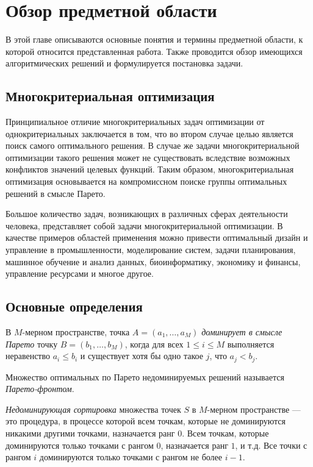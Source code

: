 \chapter{Обзор предметной области}
В этой главе описываются основные понятия и термины предметной области, к которой относится представленная работа. Также проводится обзор имеющихся алгоритмических решений и формулируется постановка задачи.

\section{Многокритериальная оптимизация}
Принципиальное отличие многокритериальных задач оптимизации от однокритериальных заключается в том, что во втором случае целью является поиск самого оптимального решения.
В случае же задачи многокритериальной оптимизации такого решения может не существовать вследствие возможных конфликтов значений целевых функций.
Таким образом, многокритериальная оптимизация основывается на компромиссном поиске группы оптимальных решений в смысле Парето.

Большое количество задач, возникающих в различных сферах деятельности человека, представляет собой задачи многокритериальной оптимизации.
В качестве примеров областей применения можно привести оптимальный дизайн и управление в промышленности, моделирование систем, задачи планирования, машинное обучение и анализ данных, биоинформатику, экономику и финансы, управление ресурсами и многое другое.

\section{Основные определения}
\begin{definition}
    В $M$-мерном пространстве, точка $A = (a_1, \ldots, a_M)$ \textit{доминирует в смысле Парето} точку $B = (b_1, \ldots, b_M)$, когда для всех $1 \leq i \leq M$ выполняется неравенство $a_i \leq b_i$ и существует хотя бы одно такое $j$, что $a_j < b_j$.
\end{definition}
\begin{definition}
    Множество оптимальных по Парето недоминируемых решений называется \textit{Парето-фронтом}.
\end{definition}
\begin{definition}
\textit{Недоминирующая сортировка} множества точек $S$ в $M$-мерном пространстве --- это процедура, в процессе которой всем точкам, которые не доминируются никакими другими точками, назначается ранг $0$.
Всем точкам, которые доминируются только точками с рангом $0$, назначается ранг $1$, и т.д.
Все точки с рангом $i$ доминируются только точками с рангом не более $i - 1$.
\end{definition}


